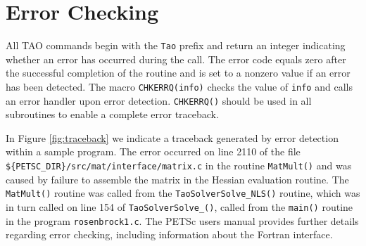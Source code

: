 \begin{comment}
  Figure~\ref{fig:exrun} illustrates compiling and running a TAO
  program using MPICH.  Note that different sites may have slightly
  different library and compiler names.
\end{comment}

\begin{comment}
  Users who are experiencing difficulties linking TAO programs should
  refer to the troubleshooting guide via the TAO home page {\tt
    http://www.mcs.anl.gov/tao}. or the source code given by the file
  \texttt{{TAO\_DIR}/docs/troubleshooting.html}.
\end{comment}

\begin{comment}
\begin{figure}[htb]
{\footnotesize
\begin{verbatim}
[ember] ex2 -tao_method tao_nls -tao_monitor
iter = 0, Function value: -0.330579, Residual: 0.728961
iter = 1, Function value: -0.427745, Residual: 3.64242e-07
iter = 2, Function value: -0.427745, Residual: 2.03244e-12

[ember] mpirun -np 2 ex2 -tao_method tao_nls -tao_monitor
iter = 0, Function value: -0.330579, Residual: 0.728961
iter = 1, Function value: -0.427745, Residual: 3.63647e-07
iter = 2, Function value: -0.427745, Residual: 2.18415e-12

\end{verbatim}
}
\nobreak
\caption{Running a TAO Program}
\label{fig:exrun}
\end{figure}
  
\end{comment}


\section{Error Checking}

All TAO commands begin with the \texttt{Tao} prefix and return an
integer indicating whether an error has occurred during the call.  The
error code equals zero after the successful completion of the routine
and is set to a nonzero value if an error has been detected.  The
macro \texttt{CHKERRQ(info)} checks the value of \texttt{info} and calls an
error handler upon error detection.  \texttt{CHKERRQ()} should be used in
all subroutines to enable a complete error traceback.

In Figure \ref{fig:traceback} we indicate a traceback generated by
error detection within a sample program. The error occurred on line
2110 of the file \texttt{\$\{PETSC\_DIR\}/src/mat/interface/matrix.c} in the
routine \texttt{MatMult()} and was caused by failure to assemble the 
matrix in the Hessian evaluation routine.
The \texttt{MatMult()} routine was called from
the \texttt{TaoSolverSolve\_NLS()} routine, which was in turn called on line 
154 of \texttt{TaoSolverSolve\_()}, called from the \texttt{main()} routine 
in the program \texttt{rosenbrock1.c}.  The PETSc users
manual provides further details regarding error checking, including
information about the Fortran interface.

